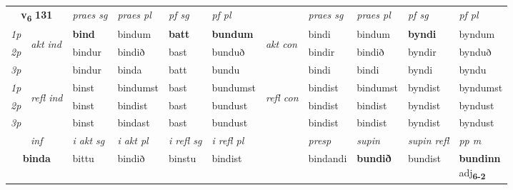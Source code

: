 \noindent
\begin{tabular}{lllllllllll} \toprule
\multicolumn{2}{c}{\textbf{v{\textsubscript{6}}} \Large{\textbf{131}}}  &  \textit{praes sg}  & \textit{praes pl}  &\textit{ pf sg} & \textit{pf pl} &  &  \textit{praes sg}  & \textit{praes pl}  & \textit{pf sg} & \textit{pf pl } \\*
	\cmidrule{3-6} \cmidrule{8-11}
 {\textit{1p}} & \multirow{3}{*}{\begin{turn}{90}\textit{akt ind}\end{turn}} & \textbf{bind} & bindum & \textbf{batt} & \textbf{bundum} & \multirow{3}{*}{\begin{turn}{90}\textit{akt con}\end{turn}} &bindi & bindum & \textbf{byndi} & byndum\\*
 {\textit{2p}} &  &  bindur  & bindið & bast & bunduð & & bindir & bindið & byndir & bynduð \\*
{\textit{3p}} &  & bindur & binda & batt & bundu & & bindi & bindi& byndi & byndu \\*
\cmidrule{3-6} \cmidrule{8-11}
 {\textit{1p}} & \multirow{3}{*}{\begin{turn}{90}\textit{refl ind}\end{turn}}  & binst & bindumst & bast & bundumst & \multirow{3}{*}{\begin{turn}{90}\textit{refl con}\end{turn}}  &bindist & bindumst & byndist & byndumst \\*
 {\textit{2p}} &  & binst & bindist & bast & bundust & &bindist & bindist & byndist & byndust \\*
 {\textit{3p}}  & & binst & bindast & bast & bundust & & bindist & bindist& byndist & byndust \\*
\cmidrule{3-6} \cmidrule{8-11}

   \multicolumn{2}{c}{\textit{inf}}  & \textit{i akt sg} & \textit{i akt pl} & \textit{i refl sg} & \textit{i refl pl} && \textit{presp} & \textit{supin} & \textit{supin refl} & \textit{pp m} \\*
  \multicolumn{2}{c}{\textbf{binda}} & bittu  & bindið & binstu & bindist && bindandi &  \textbf{bundið} & bundist & \specialcell{\textbf{bundinn} \\ adj\textbf{\textsubscript{6-2}}} \\*
\end{tabular}

